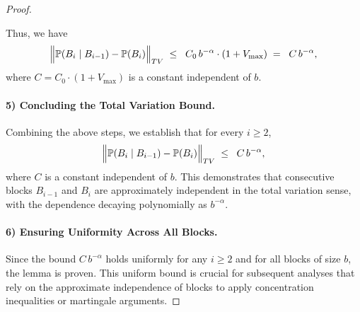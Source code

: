 \begin{proof}
\begin{enumerate}
    Thus, we have
    \[
      \Bigl\| \mathbb{P}(B_i \mid B_{i-1}) - \mathbb{P}(B_i) \Bigr\|_{TV}
      \;\le\;\;
      C_0\,b^{-\alpha} \cdot (1 + V_{\max})
      \;=\;\;
      C\,b^{-\alpha},
    \]
    where \( C = C_0 \cdot (1 + V_{\max}) \) is a constant independent of \( b \).

\end{enumerate}

\paragraph{5) Concluding the Total Variation Bound.}
Combining the above steps, we establish that for every \( i \geq 2 \),
\[
  \Bigl\|\mathbb{P}(B_i \mid B_{i-1}) - \mathbb{P}(B_i)\Bigr\|_{TV}
  \;\le\;\;
  C\,b^{-\alpha},
\]
where \( C \) is a constant independent of \( b \). This demonstrates that consecutive blocks \( B_{i-1} \) and \( B_i \) are approximately independent in the total variation sense, with the dependence decaying polynomially as \( b^{-\alpha} \).

\paragraph{6) Ensuring Uniformity Across All Blocks.}
Since the bound \( C\,b^{-\alpha} \) holds uniformly for any \( i \geq 2 \) and for all blocks of size \( b \), the lemma is proven. This uniform bound is crucial for subsequent analyses that rely on the approximate independence of blocks to apply concentration inequalities or martingale arguments.

\end{proof}
